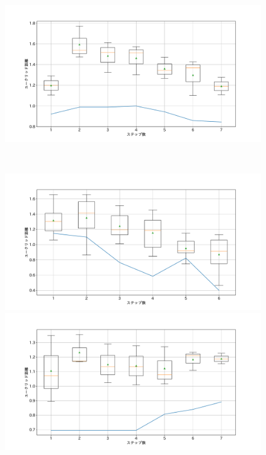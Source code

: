 \begin{figure}[h]
\begin{minipage}[b]{0.48\linewidth}
 \end{minipage}
 \begin{minipage}[b]{0.48\linewidth}
  \centering
  \includegraphics[scale=0.15]{./imgs/gaChange/cake2_2.pdf}
 \end{minipage}\\
 \begin{minipage}[b]{0.48\linewidth}
  \centering
  \includegraphics[scale=0.15]{./imgs/gaChange/cake1_3.pdf}
 \end{minipage}
 \begin{minipage}[b]{0.48\linewidth}
  \centering
  \includegraphics[scale=0.15]{./imgs/gaChange/cake2_3.pdf}

\end{minipage}
\end{figure}

